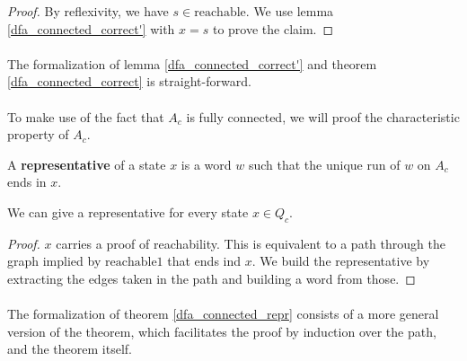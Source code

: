 \begin{proof}
    By reflexivity, we have $s \in \mathrm{reachable}$. 
    We use lemma \ref{dfa_connected_correct'} with $x = s$ to prove the claim.
\end{proof}

\paragraph{}
The formalization of lemma \ref{dfa_connected_correct'} and theorem \ref{dfa_connected_correct} is straight-forward.


\paragraph{}
To make use of the fact that $A_c$ is fully connected, we will proof the characteristic property of $A_c$.

\begin{definition}
    A \textbf{representative} of a state $x$ is a word $w$ such that the unique run of $w$ on $A_c$ ends in $x$.
\end{definition}

\begin{lemma}
    \label{dfa_connected_repr}
    We can give a representative for every state $x \in Q_c$.
\end{lemma}

\begin{proof}
    $x$ carries a proof of reachability.
    This is equivalent to a path through the graph implied by $\mathrm{reachable1}$ that ends ind $x$.
    We build the representative by extracting the edges taken in the path and building a word from those.
\end{proof}

\paragraph{}
The formalization of theorem \ref{dfa_connected_repr} consists of a more general version of the theorem, 
which facilitates the proof by induction over the path, and the theorem itself.

